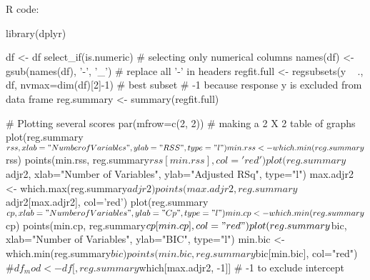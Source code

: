 R code:
\begin{rcode}[deletekeywords={df, if, summary, min, max, which}]
library(dplyr)

df <- df %
          select_if(is.numeric) # selecting only numerical columns
names(df) <- gsub(names(df), '-', '_') # replace all '-' in headers
regfit.full <- regsubsets(y ~ ., df, nvmax=dim(df)[2]-1)  # best subset 
# -1 because response y is excluded from data frame
reg.summary <- summary(regfit.full) 

# Plotting several scores
par(mfrow=c(2, 2)) # making a 2 X 2 table of graphs
plot(reg.summary$rss, xlab="Number of Variables", ylab="RSS", type="l")
min.rss <- which.min(reg.summary$rss)
points(min.rss, reg.summary$rss[min.rss], col='red')
plot(reg.summary$adjr2, xlab="Number of Variables", ylab="Adjusted RSq", type="l")
max.adjr2 <- which.max(reg.summary$adjr2)
points(max.adjr2, reg.summary$adjr2[max.adjr2], col='red')
plot(reg.summary$cp, xlab="Number of Variables", ylab="Cp", type="l")
min.cp <- which.min(reg.summary$cp)
points(min.cp, reg.summary$cp[min.cp], col="red")
plot(reg.summary$bic, xlab="Number of Variables", ylab="BIC", type="l")
min.bic <- which.min(reg.summary$bic)
points(min.bic, reg.summary$bic[min.bic], col="red") #$

df_mod <- df[, reg.summary$which[max.adjr2, -1]] # -1 to exclude intercept
\end{rcode}

